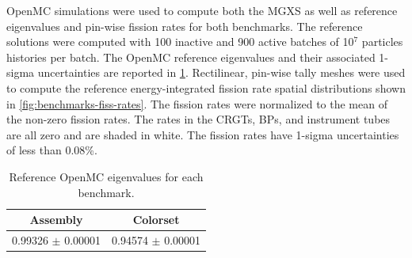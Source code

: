 OpenMC simulations were used to compute both the MGXS as well as reference eigenvalues and pin-wise fission rates for both benchmarks. The reference solutions were computed with 100 inactive and 900 active batches of 10$^7$ particles histories per batch. The OpenMC reference eigenvalues and their associated 1-sigma uncertainties are reported in \cref{tab:keff-reference}. Rectilinear, pin-wise tally meshes were used to compute the reference energy-integrated fission rate spatial distributions shown in \cref{fig:benchmarks-fiss-rates}. The fission rates were normalized to the mean of the non-zero fission rates. The rates in the CRGTs, BPs, and instrument tubes are all zero and are shaded in white. The fission rates have 1-sigma uncertainties of less than 0.08\%.

\begin{table}[h!]
  \centering
  \caption{Reference OpenMC eigenvalues for each benchmark.}
  \label{tab:keff-reference} 
  \begin{tabular}{c c}
  \toprule
  {\bf Assembly} &
  {\bf Colorset} \\
  \midrule
  0.99326 $\pm$ 0.00001 & 0.94574 $\pm$ 0.00001 \\
  \bottomrule
\end{tabular}
\end{table}

